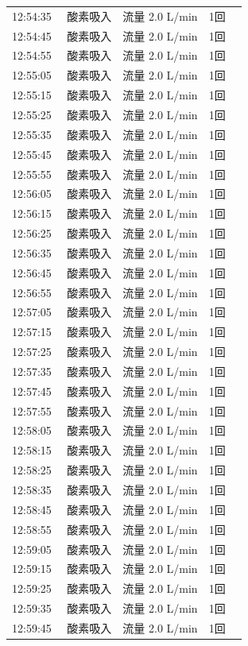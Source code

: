 \documentclass[UTF8,10pt,a4paper,fontset=fandol]{ctexart}
\begin{document}
\begin{minipage}[t]{0.48\linewidth}
\begin{tabular}{@{}p{0.22\linewidth}p{0.72\linewidth}@{}}
12:54:35 & 酸素吸入　流量 2.0 L/min　1回\\
12:54:45 & 酸素吸入　流量 2.0 L/min　1回\\
12:54:55 & 酸素吸入　流量 2.0 L/min　1回\\
12:55:05 & 酸素吸入　流量 2.0 L/min　1回\\
12:55:15 & 酸素吸入　流量 2.0 L/min　1回\\
12:55:25 & 酸素吸入　流量 2.0 L/min　1回\\
12:55:35 & 酸素吸入　流量 2.0 L/min　1回\\
12:55:45 & 酸素吸入　流量 2.0 L/min　1回\\
12:55:55 & 酸素吸入　流量 2.0 L/min　1回\\
12:56:05 & 酸素吸入　流量 2.0 L/min　1回\\
12:56:15 & 酸素吸入　流量 2.0 L/min　1回\\
12:56:25 & 酸素吸入　流量 2.0 L/min　1回\\
12:56:35 & 酸素吸入　流量 2.0 L/min　1回\\
12:56:45 & 酸素吸入　流量 2.0 L/min　1回\\
12:56:55 & 酸素吸入　流量 2.0 L/min　1回\\
12:57:05 & 酸素吸入　流量 2.0 L/min　1回\\
12:57:15 & 酸素吸入　流量 2.0 L/min　1回\\
12:57:25 & 酸素吸入　流量 2.0 L/min　1回\\
12:57:35 & 酸素吸入　流量 2.0 L/min　1回\\
12:57:45 & 酸素吸入　流量 2.0 L/min　1回\\
12:57:55 & 酸素吸入　流量 2.0 L/min　1回\\
12:58:05 & 酸素吸入　流量 2.0 L/min　1回\\
12:58:15 & 酸素吸入　流量 2.0 L/min　1回\\
12:58:25 & 酸素吸入　流量 2.0 L/min　1回\\
12:58:35 & 酸素吸入　流量 2.0 L/min　1回\\
12:58:45 & 酸素吸入　流量 2.0 L/min　1回\\
12:58:55 & 酸素吸入　流量 2.0 L/min　1回\\
12:59:05 & 酸素吸入　流量 2.0 L/min　1回\\
12:59:15 & 酸素吸入　流量 2.0 L/min　1回\\
12:59:25 & 酸素吸入　流量 2.0 L/min　1回\\
12:59:35 & 酸素吸入　流量 2.0 L/min　1回\\
12:59:45 & 酸素吸入　流量 2.0 L/min　1回\\

\end{tabular}
\end{minipage}
\end{document}
